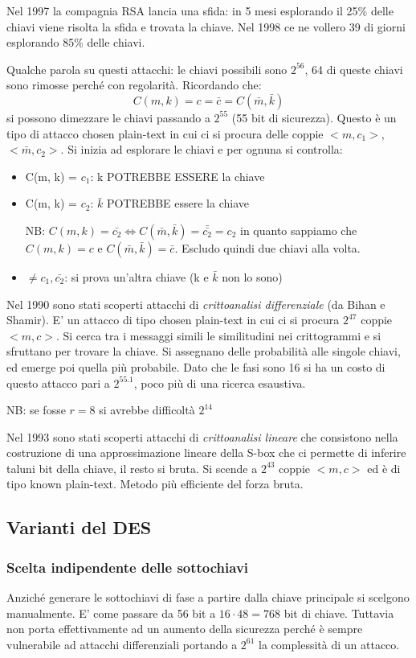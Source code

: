 Nel 1997 la compagnia RSA lancia una sfida: in 5 mesi esplorando il 25\% delle chiavi viene risolta la sfida e trovata la chiave.
Nel 1998 ce ne vollero 39 di giorni esplorando 85\% delle chiavi.

Qualche parola su questi attacchi: le chiavi possibili sono $2^{56}$, 64 di queste chiavi sono rimosse perché con regolarità. Ricordando che:
$$ C(m, k) = c = \bar{c} = C(\bar{m}, \bar{k}) $$
si possono dimezzare le chiavi passando a $2^{55}$ (55 bit di sicurezza). Questo è un tipo di attacco chosen plain-text in cui ci si procura delle coppie $<m, c_1>$, $<\bar{m}, c_2>$. Si inizia ad esplorare le chiavi e per ognuna si controlla:
\begin{itemize}
    \item C(m, k) = $c_1$: k POTREBBE ESSERE la chiave
    \item C(m, k) = $c_2$: $\bar{k}$ POTREBBE essere la chiave
    
    NB: $C(m,k) = \bar{c_2} \iff C(\bar{m},\bar{k}) = \bar{\bar{c_2}} = c_2$ in quanto sappiamo che $C(m, k) = c$ e $C(\bar{m}, \bar{k})=\bar{c}$. Escludo quindi due chiavi alla volta.
    \item $\neq c_1, \bar{c_2}$: si prova un'altra chiave (k e $\bar{k}$ non lo sono)
\end{itemize}

Nel 1990 sono stati scoperti attacchi di \emph{crittoanalisi differenziale} (da Bihan e Shamir). E' un attacco di tipo chosen plain-text in cui ci si procura $2^{47}$ coppie $<m,c>$.
Si cerca tra i messaggi simili le similitudini nei crittogrammi e si sfruttano per trovare la chiave.
Si assegnano delle probabilità alle singole chiavi, ed emerge poi quella più probabile.
Dato che le fasi sono 16 si ha un costo di questo attacco pari a $2^{55.1}$, poco più di una ricerca esaustiva.

NB: se fosse $r=8$ si avrebbe difficoltà $2^{14}$

Nel 1993 sono stati scoperti attacchi di \emph{crittoanalisi lineare} che consistono nella costruzione di una approssimazione lineare della S-box che ci permette di inferire taluni bit della chiave, il resto si bruta.
Si scende a $2^{43}$ coppie $<m, c>$ ed è di tipo known plain-text.
Metodo più efficiente del forza bruta.

\subsection{Varianti del DES}

\subsubsection{Scelta indipendente delle sottochiavi}
Anziché generare le sottochiavi di fase a partire dalla chiave principale si scelgono manualmente.
E' come passare da 56 bit a $16 \cdot 48 = 768$ bit di chiave.
Tuttavia non porta effettivamente ad un aumento della sicurezza perché è sempre vulnerabile ad attacchi differenziali portando a $2^{61}$ la complessità di un attacco.


